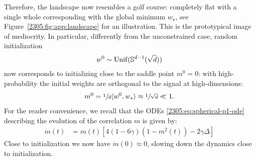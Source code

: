 Therefore, the landscape now resembles a golf course: completely flat with a single whole corresponding with the global minimum $w_{\star}$, see Figure~\ref{2305:fig:app:landscape} for an illustration. This is the prototypical image of mediocrity. In particular, differently from the unconstrained case, random initialization
\begin{align}
    w^{0}\sim {\rm Unif}(\mathbb{S}^{d-1}(\sqrt{d})) 
\end{align}
now corresponds to initializing close to the saddle point $m^{0}=0$: with high-probability the initial weights are orthogonal to the signal at high-dimensions: 
\begin{align}
    m^{0}=\sfrac{1}{d}\langle w^{0},w_{\star}\rangle\approx  \sfrac{1}{\sqrt{d}}\ll 1.
\end{align} 
For the reader convenience, we recall that the ODEs \eqref{2305:eq:spherical-p1-ode} describing the evolution of the correlation $m$ is given by:
\begin{align}
  \dot{m}(t) &= m{(t)}\left[4(1-6\gamma)(1-m^2{(t)})-2\gamma\Delta\right]
\end{align}
Close to initialization we now have $\dot{m}(0) \approx 0$, slowing down the dynamics close to initialization.
